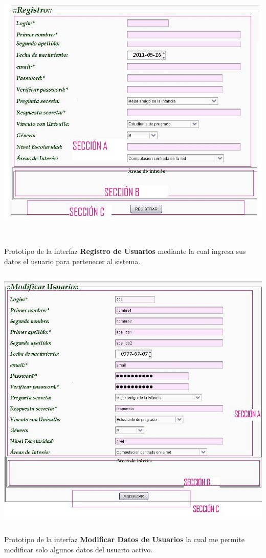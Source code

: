 \begin{minipage}{1\textwidth}
	\begin{center}
	\includegraphics[width= 17cm , height= 13cm]{prototiposGui/registro}
	\end{center}
	{Prototipo de la interfaz {\bf Registro de Usuarios} mediante la cual ingresa sus datos el
	usuario para pertenecer al sistema. }
\end{minipage}

\begin{minipage}{1\textwidth}
	\begin{center}
	\includegraphics[width= 17cm , height= 13cm]{prototiposGui/modificarUsuarios}
	\end{center}
	{Prototipo de la interfaz {\bf Modificar Datos de Usuarios} la cual me permite modificar solo
	algunos	datos del usuario activo. }
\end{minipage}

